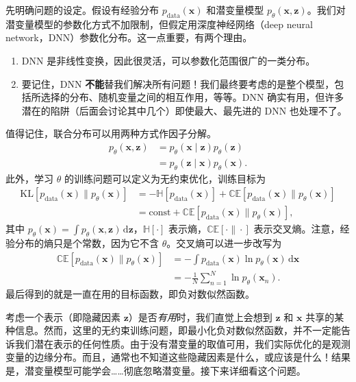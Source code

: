 先明确问题的设定。假设有经验分布 $p_{\mathrm{data}}(\mathbf{x})$ 和潜变量模型 $p_\theta(\mathbf{x},\mathbf{z})$。我们对潜变量模型的参数化方式不加限制，但假定用深度神经网络（deep neural network，DNN）参数化分布。这一点重要，有两个理由。
\begin{enumerate}
\item DNN 是非线性变换，因此很灵活，可以参数化范围很广的一类分布。
\item 要记住，DNN \textbf{不能}替我们解决所有问题！我们最终要考虑的是整个模型，包括所选择的分布、随机变量之间的相互作用，等等。DNN 确实有用，但许多潜在的陷阱（后面会讨论其中几个）即使最大、最先进的 DNN 也处理不了。
\end{enumerate}

值得记住，联合分布可以用两种方式作因子分解。
\begin{align}
p_\theta(\mathbf{x},\mathbf{z})&=p_\theta(\mathbf{x}\mid\mathbf{z})p_\theta(\mathbf{z}) \tag{5.69}\label{eq:05-69}\\
 &=p_\theta(\mathbf{z}\mid\mathbf{x})p_\theta(\mathbf{x}). \tag{5.70}\label{eq:05-70}
\end{align}
此外，学习 $\theta$ 的训练问题可以定义为无约束优化，训练目标为
\begin{align}
\mathrm{KL}[p_{\mathrm{data}}(\mathbf{x})\|p_\theta(\mathbf{x})]
  &=-\mathbb{H}[p_{\mathrm{data}}(\mathbf{x})]
    +\mathbb{CE}[p_{\mathrm{data}}(\mathbf{x})\|p_\theta(\mathbf{x})] \tag{5.71}\label{eq:05-71}\\
  &=\mathrm{const}+\mathbb{CE}[p_{\mathrm{data}}(\mathbf{x})\|p_\theta(\mathbf{x})], \tag{5.72}\label{eq:05-72}
\end{align}
其中 $p_\theta(\mathbf{x})=\int p_\theta(\mathbf{x},\mathbf{z})\,\mathrm{d}\mathbf{z}$，$\mathbb{H}[\cdot]$ 表示熵，$\mathbb{CE}[\cdot\|\cdot]$ 表示交叉熵。注意，经验分布的熵只是个常数，因为它不含 $\theta$。交叉熵可以进一步改写为
\begin{align}
\mathbb{CE}[p_{\mathrm{data}}(\mathbf{x})\|p_\theta(\mathbf{x})]
  &=-\int p_{\mathrm{data}}(\mathbf{x})\ln p_\theta(\mathbf{x})\,\mathrm{d}\mathbf{x} \tag{5.73}\label{eq:05-73}\\
  &=-\frac{1}{N}\sum_{n=1}^N\ln p_\theta(\mathbf{x}_n). \tag{5.74}\label{eq:05-74}
\end{align}
最后得到的就是一直在用的目标函数，即负对数似然函数。

考虑一个表示（即隐藏因素 $\mathbf{z}$）是否\emph{有用}时，我们直觉上会想到 $\mathbf{z}$ 和 $\mathbf{x}$ 共享的某种信息。然而，这里的无约束训练问题，即最小化负对数似然函数，并不一定能告诉我们潜在表示的任何性质。由于没有潜变量的取值可用，我们实际优化的是观测变量的边缘分布。而且，通常也不知道这些隐藏因素是什么，或应该是什么！结果是，潜变量模型可能学会……彻底忽略潜变量。接下来详细看这个问题。

